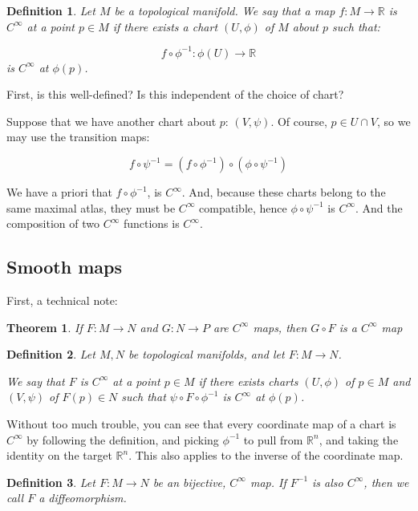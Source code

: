 \documentclass[10pt]{article}
\newtheorem{definition}{Definition}[section]
\newtheorem{theorem}{Theorem}[section]
\begin{document}
\begin{definition}
Let $M$ be a topological manifold. We say that a map $f: M \to \mathbb{R}$ is $C^\infty$ at a point $p \in M$ if there exists a chart $(U, \phi)$ of $M$ about $p$ such that:

$$ f \circ \phi^{-1}: \phi(U) \to \mathbb{R} $$ is $C^\infty$ at $\phi(p)$.

\end{definition}

First, is this well-defined? Is this independent of the choice of chart?

Suppose that we have another chart about $p$: $(V, \psi)$. Of course, $p \in U \cap V$, so we may use the transition maps:

$$ f \circ \psi^{-1} = (f \circ \phi^{-1}) \circ ( \phi \circ \psi^{-1}) $$

We have a priori that $f \circ \phi^{-1}$, is $C^\infty$. And, because these charts belong to the same maximal atlas, they must be $C^\infty$ compatible, hence $ \phi \circ \psi^{-1}$ is $C^\infty$. And the composition of two $C^\infty$ functions is $C^\infty$. 

\subsection{Smooth maps}

First, a technical note:

\begin{theorem}
If $F: M \to N$ and $G: N \to P$ are $C^\infty$ maps, then $G \circ F$ is a $C^\infty$ map
\end{theorem}

\begin{definition}
Let $M, N$ be topological manifolds, and let $F: M \to N$.

We say that $F$ is $C^\infty$ at a point $p\in M$ if there exists charts $(U, \phi)$ of $p \in M$ and $(V, \psi)$ of $F(p)\in N$ such that $  \psi \circ F \circ \phi^{-1} $ is $C^\infty$ at $\phi(p)$.

\end{definition}

Without too much trouble, you can see that every coordinate map of a chart is $C^\infty$ by following the definition, and picking $\phi^{-1}$ to pull from $\mathbb{R}^n$, and taking the identity on the target $\mathbb{R}^n$. This also applies to the inverse of the coordinate map.

\begin{definition}
Let $F: M \to N$ be an bijective, $C^\infty$ map. If $F^{-1}$ is also $C^\infty$, then we call $F$ a diffeomorphism.

\end{definition}
\end{document}
